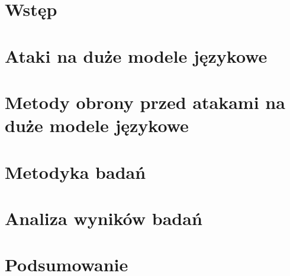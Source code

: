 \chapter{Wstęp}


\chapter{Ataki na duże modele językowe}


\chapter{Metody obrony przed atakami na duże modele językowe}


\chapter{Metodyka badań}


\chapter{Analiza wyników badań}


\chapter{Podsumowanie}
